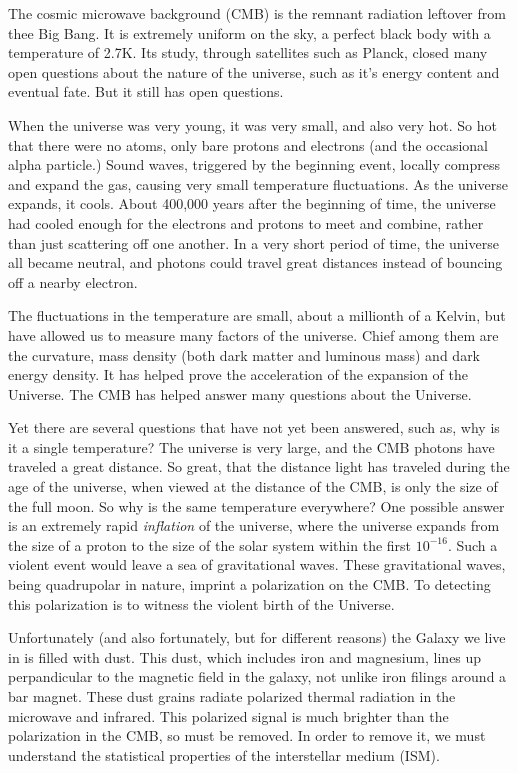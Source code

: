 The cosmic microwave background (CMB) is the remnant radiation leftover from
thee Big Bang.  It is extremely uniform on the sky, a perfect black body with a
temperature of 2.7K.  Its study, through satellites such as Planck, closed many open
questions about the nature of the universe, such as it's energy content and
eventual fate.  But it still has open questions.

When the universe was very young, it was very small, and also very hot.  So hot
that there were no atoms, only bare protons and electrons (and the occasional
alpha particle.)  Sound waves, triggered by the
beginning event, locally compress and expand the gas, causing very small
temperature fluctuations.  As the universe expands, it cools.  About 400,000
years after the beginning of time, the universe had cooled enough for the electrons and
protons to meet and combine, rather than just scattering off one another.  In a
very short period of time, the universe all became neutral, and photons could
travel great distances instead of bouncing off a nearby electron.  

The fluctuations in the temperature are small, about a millionth of a Kelvin,
but have allowed us to measure many factors of the universe.  Chief among them
are the curvature, mass density (both dark matter and luminous mass) and dark energy
density.  It has helped prove the acceleration of the expansion of the Universe.
The CMB has helped answer many questions about the Universe.

Yet there are several questions that
have not yet been answered, such as, why is it a single temperature?  The
universe is very large, and the CMB photons have traveled a great distance.  So
great, that the distance light has traveled during the age of the universe, when
viewed at the distance of the CMB, is only the size of the full moon.  So why is
the same temperature everywhere?  One possible answer is an extremely rapid
\emph{inflation} of the universe, where the universe expands from the size of a
proton to the size of the solar system within the first $10^{-16}$.  Such a
violent event would leave a sea of gravitational waves.  These gravitational
waves, being quadrupolar in nature, imprint a polarization on the CMB. To detecting
this polarization is to witness the violent birth of the Universe.

Unfortunately (and also fortunately, but for different reasons) the Galaxy we live in is filled with dust.
This dust, which includes iron and magnesium, lines up perpandicular to the magnetic
field in the galaxy, not unlike iron filings around a bar magnet.  These dust
grains radiate polarized thermal radiation in the microwave and infrared.  This
polarized signal is much brighter than the polarization in the CMB, so must be
removed.  In order to remove it, we must understand the statistical properties
of the interstellar medium (ISM).  

